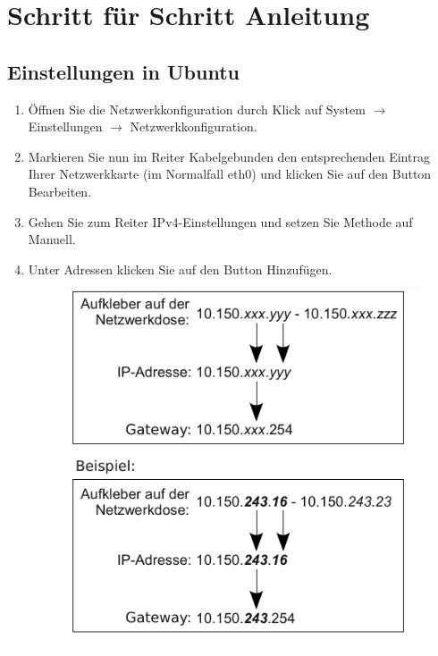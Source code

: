 \documentclass[a4paper,12pt]{scrartcl}
\begin{document}
\section*{Schritt für Schritt Anleitung}
\subsection*{Einstellungen in Ubuntu}
\begin{enumerate}
    \item Öffnen Sie die Netzwerkkonfiguration durch Klick auf System $\rightarrow$ Einstellungen $\rightarrow$ Netzwerkkonfiguration.
    \item Markieren Sie nun im Reiter Kabelgebunden den entsprechenden Eintrag Ihrer Netzwerkkarte (im Normalfall eth0) und klicken Sie auf den Button Bearbeiten.
    \item Gehen Sie zum Reiter IPv4-Einstellungen und setzen Sie Methode auf Manuell.
    \item Unter Adressen klicken Sie auf den Button Hinzufügen.
      \begin{figure}[h!]
        \centering
        \begin{minipage}[c]{0.45\linewidth}
          \centering
          \includegraphics[width=\linewidth,keepaspectratio]{Bilder/IP_Gerneric}
        \end{minipage}

\end{figure}
\end{enumerate}
\end{document}
